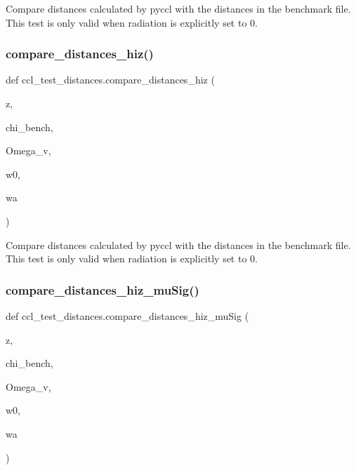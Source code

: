 \begin{DoxyVerb}Compare distances calculated by pyccl with the distances in the benchmark
file.
This test is only valid when radiation is explicitly set to 0.
\end{DoxyVerb}
 \mbox{\label{namespaceccl__test__distances_a73d0450ebec8e25f65fb0c27498f7acd}} 
\subsubsection{\texorpdfstring{compare\+\_\+distances\+\_\+hiz()}{compare\_distances\_hiz()}}
{\footnotesize\ttfamily def ccl\+\_\+test\+\_\+distances.\+compare\+\_\+distances\+\_\+hiz (\begin{DoxyParamCaption}\item[{}]{z,  }\item[{}]{chi\+\_\+bench,  }\item[{}]{Omega\+\_\+v,  }\item[{}]{w0,  }\item[{}]{wa }\end{DoxyParamCaption})}

\begin{DoxyVerb}Compare distances calculated by pyccl with the distances in the benchmark
file.
This test is only valid when radiation is explicitly set to 0.
\end{DoxyVerb}
 \mbox{\label{namespaceccl__test__distances_ac0434cb9a83997e0a4bdd1017129c566}} 
\subsubsection{\texorpdfstring{compare\+\_\+distances\+\_\+hiz\+\_\+mu\+Sig()}{compare\_distances\_hiz\_muSig()}}
{\footnotesize\ttfamily def ccl\+\_\+test\+\_\+distances.\+compare\+\_\+distances\+\_\+hiz\+\_\+mu\+Sig (\begin{DoxyParamCaption}\item[{}]{z,  }\item[{}]{chi\+\_\+bench,  }\item[{}]{Omega\+\_\+v,  }\item[{}]{w0,  }\item[{}]{wa }\end{DoxyParamCaption})}

